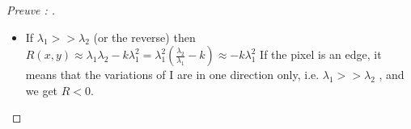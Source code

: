 \documentclass{article}
\theoremstyle{plain}%
\theoremstyle{definition}
\theoremstyle{remark}
\begin{document}
\begin{proof}[Preuve : ]
\begin{itemize}
        \item If $ \lambda _1 >> \lambda _2 $  (or the reverse) then
        $ R(x,y) \approx \lambda _1 \lambda _2 - k \lambda _1^2 = \lambda _1^2 ( \frac{\lambda _2}{\lambda _1} - k) \approx - k \lambda _1^2$
        If the pixel is an edge, it means that the variations of I are in one direction only, i.e. $ \lambda _1 >> \lambda _2 $ , and we get $ R < 0 $.
    \end{itemize}
\end{proof}
\end{document}
